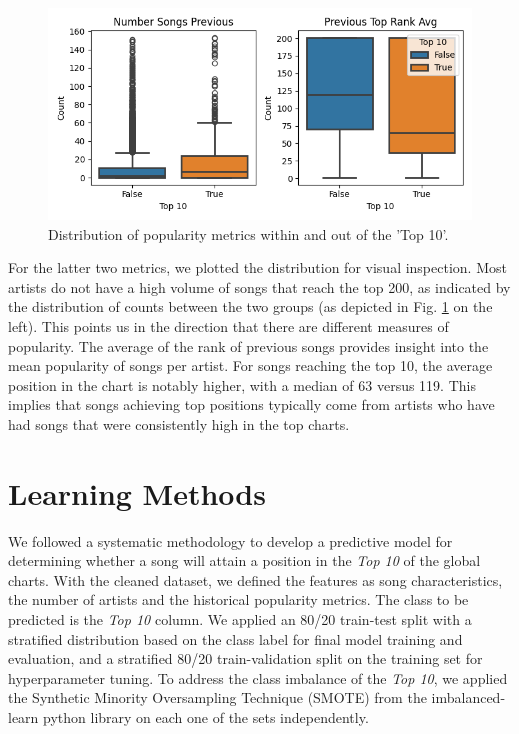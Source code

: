 \documentclass{article}
\begin{document}
\begin{figure}[H]
  \centering
  \includegraphics[width=0.8\linewidth]{boxplot.png}
  \caption{Distribution of popularity metrics within and out of the 'Top 10'.}
  \label{fig:box}
\end{figure}

For the latter two metrics, we plotted the distribution for visual inspection. Most artists do not have a high volume of songs that reach the top 200, as indicated by the distribution of counts between the two groups (as depicted in Fig. \ref{fig:box} on the left). This points us in the direction that there are different measures of popularity. The average of the rank of previous songs provides insight into the mean popularity of songs per artist. For songs reaching the top 10, the average position in the chart is notably higher, with a median of 63 versus 119. This implies that songs achieving top positions typically come from artists who have had songs that were consistently high in the top charts. 


\section{Learning Methods}

We followed a systematic methodology to develop a predictive model for determining whether a song will attain a position in the \textit{Top 10} of the global charts. With the cleaned dataset, we defined the features as song characteristics, the number of artists and the historical popularity metrics. The class to be predicted is the \textit{Top 10} column. We applied an 80/20 train-test split with a stratified distribution based on the class label for final model training and evaluation, and a stratified 80/20 train-validation split on the training set for hyperparameter tuning. To address the class imbalance of the \textit{Top 10}, we applied the Synthetic Minority Oversampling Technique (SMOTE) from the imbalanced-learn python library on each one of the sets independently. 
\end{document}
